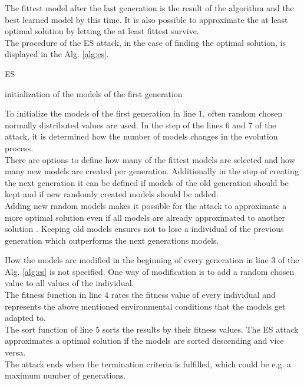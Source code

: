 The fittest model after the last generation is the result of the algorithm and the best learned model by this time.
It is also possible to approximate the at least optimal solution by letting the at least fittest survive.\\
The procedure of the \ac{ES} attack, in the case of finding the optimal solution, is displayed in the Alg. \ref{alg:es}.

\SetAlCapHSkip{0.2em}
\begin{algorithm}[H] %
\Indm
\SetAlgoLined
\caption{\acl{ES}}
\label{alg:es}
\Indp

initialization of the models of the first generation\\
\end{algorithm}

To initialize the models of the first generation in line $1$, often random chosen normally distributed values are used.
In the step of the lines $6$ and $7$ of the attack, it is determined how the number of models changes in the evolution process.\\
There are options to define how many of the fittest models are selected and how many new models are created per generation.
Additionally in the step of creating the next generation it can be defined if models of the old generation should be kept and if new randomly created models should be added.\\
Adding new random models makes it possible for the attack to approximate a more optimal solution even if all models are already approximated to another solution \cite{2016EvolutionStrategy}.
Keeping old models ensures not to lose a individual of the previous generation which outperforms the next generations models.

How the models are modified in the beginning of every generation in line $3$ of the Alg. \ref{alg:es} is not specified.
One way of modification is to add a random chosen value to all values of the individual.\\
The fitness function in line $4$ rates the fitness value of every individual and represents the above mentioned environmental conditions that the models get adapted to.\\
The sort function of line $5$ sorts the results by their fitness values.
The \ac{ES} attack approximates a optimal solution if the models are sorted descending and vice versa.\\
The attack ends when the termination criteria is fulfilled, which could be e.g. a maximum number of generations.

